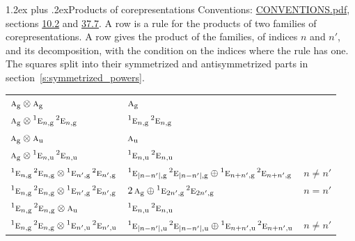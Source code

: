 \documentclass[10pt,a4paper]{article}
\makeatletter
\renewcommand\section{\@startsection{section}{1}{\z@}{-3ex plus -1ex minus -.2ex}%
  {1.2ex plus .2ex}{\normalfont\large\sffamily\bfseries\color{parttitle}}}
\numberwithin{equation}{section}
\newcommand{\irr}[1]{\text{\normalfont\scshape #1}}
\newcommand{\conjpair}[1]{{}^{#1}}
\newcommand{\ptag}[1]{\mathrm{#1}}
\newcommand{\irrprod}{\otimes}
\makeatother
\begin{document}
\section{Products of corepresentations}\label{s:fusion}
Conventions: \href{../../CONVENTIONS.pdf}{CONVENTIONS.pdf}, sections \href{../../../rotation/CONVENTIONS.pdf\#conv.10.2}{10.2} and \href{../../CONVENTIONS.pdf\#conv.37.7}{37.7}.
A row is a rule for the products of two families of corepresentations. A row gives the product of the families, of indices $n$ and $n'$, and its decomposition, with the condition on the indices where the rule has one. The squares split into their symmetrized and antisymmetrized parts in section~\ref{s:symmetrized_powers}.
{\small\begin{longtable}{@{}l@{${}={}$}ll@{}}\toprule
$\irr{a}_{\ptag{g}}\irrprod \irr{a}_{\ptag{g}}$ & $\irr{a}_{\ptag{g}}$ & \\
$\irr{a}_{\ptag{g}}\irrprod \conjpair{1}\irr{e}_{n,\ptag{g}}\,\conjpair{2}\irr{e}_{n,\ptag{g}}$ & $\conjpair{1}\irr{e}_{n,\ptag{g}}\,\conjpair{2}\irr{e}_{n,\ptag{g}}$ & \\
$\irr{a}_{\ptag{g}}\irrprod \irr{a}_{\ptag{u}}$ & $\irr{a}_{\ptag{u}}$ & \\
$\irr{a}_{\ptag{g}}\irrprod \conjpair{1}\irr{e}_{n,\ptag{u}}\,\conjpair{2}\irr{e}_{n,\ptag{u}}$ & $\conjpair{1}\irr{e}_{n,\ptag{u}}\,\conjpair{2}\irr{e}_{n,\ptag{u}}$ & \\
$\conjpair{1}\irr{e}_{n,\ptag{g}}\,\conjpair{2}\irr{e}_{n,\ptag{g}}\irrprod \conjpair{1}\irr{e}_{n',\ptag{g}}\,\conjpair{2}\irr{e}_{n',\ptag{g}}$ & $\conjpair{1}\irr{e}_{\lvert n-n'\rvert,\ptag{g}}\,\conjpair{2}\irr{e}_{\lvert n-n'\rvert,\ptag{g}}\oplus \conjpair{1}\irr{e}_{n+n',\ptag{g}}\,\conjpair{2}\irr{e}_{n+n',\ptag{g}}$ & $n \ne n'$\\
$\conjpair{1}\irr{e}_{n,\ptag{g}}\,\conjpair{2}\irr{e}_{n,\ptag{g}}\irrprod \conjpair{1}\irr{e}_{n',\ptag{g}}\,\conjpair{2}\irr{e}_{n',\ptag{g}}$ & $2\,\irr{a}_{\ptag{g}}\oplus \conjpair{1}\irr{e}_{2n',\ptag{g}}\,\conjpair{2}\irr{e}_{2n',\ptag{g}}$ & $n = n'$\\
$\conjpair{1}\irr{e}_{n,\ptag{g}}\,\conjpair{2}\irr{e}_{n,\ptag{g}}\irrprod \irr{a}_{\ptag{u}}$ & $\conjpair{1}\irr{e}_{n,\ptag{u}}\,\conjpair{2}\irr{e}_{n,\ptag{u}}$ & \\
$\conjpair{1}\irr{e}_{n,\ptag{g}}\,\conjpair{2}\irr{e}_{n,\ptag{g}}\irrprod \conjpair{1}\irr{e}_{n',\ptag{u}}\,\conjpair{2}\irr{e}_{n',\ptag{u}}$ & $\conjpair{1}\irr{e}_{\lvert n-n'\rvert,\ptag{u}}\,\conjpair{2}\irr{e}_{\lvert n-n'\rvert,\ptag{u}}\oplus \conjpair{1}\irr{e}_{n+n',\ptag{u}}\,\conjpair{2}\irr{e}_{n+n',\ptag{u}}$ & $n \ne n'$\\

\end{longtable}}
\end{document}
